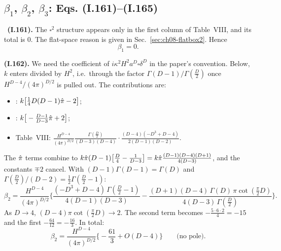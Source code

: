 \subsection{$\beta_1$, $\beta_2$, $\beta_3$: Eqs. (I.161)--(I.165)}
\tD\ \textbf{(I.161).} The $\square^2$ structure appears only in the first column of Table~VIII, and its total is $0$. The flat-space reason is given in Sec.~\ref{sec:ch08-flatbox2}. Hence
\begin{equation}
\beta_1=0 .
\tag{I.161}
\end{equation}

\textbf{(I.162).} We need the coefficient of $i\kappa^2H^2a^D\square\delta^D$ in the paper's convention. Below, $k$ enters divided by $H^2$, i.e.\ through the factor $\Gamma(D-1)/\Gamma(\frac D2)$ once $H^{D-4}/(4\pi)^{D/2}$ is pulled out. The contributions are:
\begin{itemize}[itemsep=1pt]
\item {}: $k\big[\tfrac14D(D-1)\hat\pi-2\big]$;
\item {}: $k\big[-\tfrac{D-1}{D-3}\hat\pi+2\big]$;
\item Table~VIII: $\frac{H^{D-4}}{(4\pi)^{D/2}}\frac{\Gamma(\frac D2)}{(D-3)(D-4)}\cdot\frac{(D-4)(-D^3+D-4)}{2(D-1)(D-2)}$.
\end{itemize}
The $\hat\pi$ terms combine to $k\hat\pi(D-1)\big[\tfrac D4-\tfrac1{D-3}\big]=k\hat\pi\frac{(D-1)(D-4)(D+1)}{4(D-3)}$, and the constants $\mp2$ cancel.
With $(D-1)\Gamma(D-1)=\Gamma(D)$ and $\Gamma(\tfrac D2)/(D-2)=\tfrac12\Gamma(\tfrac D2-1)$:
\begin{equation}
\beta_2=\frac{H^{D-4}}{(4\pi)^{D/2}}\Big\{\frac{(-D^3+D-4)\,\Gamma(\frac D2-1)}{4(D-1)(D-3)}-\frac{(D+1)(D-4)\,\Gamma(D)\,\pi\cot(\frac\pi2D)}{4(D-3)\,\Gamma(\frac D2)}\Big\}.
\tag{I.162}
\end{equation}
As $D\to4$, $(D-4)\pi\cot(\tfrac\pi2D)\to2$. The second term becomes $-\tfrac{5\cdot6\cdot2}{4}=-15$ and the first $-\tfrac{64}{12}=-\tfrac{16}3$. In total:
\begin{equation}
\beta_2=\frac{H^{D-4}}{(4\pi)^{D/2}}\Big\{-\frac{61}3+O(D-4)\Big\}\qquad\text{(no pole)}.
\tag{I.163}
\end{equation}


